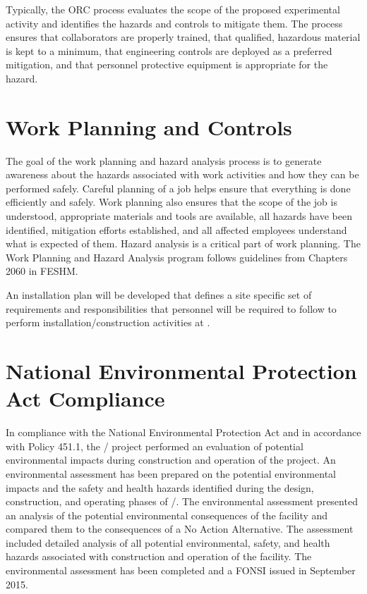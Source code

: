 Typically, the ORC  process evaluates the scope of the proposed
experimental activity and identifies the hazards and controls to
mitigate them. The process ensures that collaborators are properly trained, that
qualified, hazardous material is kept to a minimum, that engineering
controls are deployed as a preferred mitigation, and that personnel
protective equipment is appropriate for the hazard.

\section{Work Planning and Controls}

The goal of the work planning and hazard analysis process is to
generate awareness about the hazards associated with work activities
and how they can be performed safely. Careful planning of a job helps
ensure that everything is done efficiently and safely. Work planning also
ensures that the scope of the job is understood, appropriate materials
and tools are available, all hazards have been identified, mitigation
efforts established, and all affected employees understand what is
expected of them. Hazard analysis is a critical part of work planning.
The Work Planning and Hazard Analysis program follows guidelines from
Chapters 2060 in FESHM.

An installation  plan will be developed
that defines a site specific set of  requirements and
responsibilities that personnel will be required to follow to perform
installation/construction activities at \surf.

\section{National Environmental Protection Act Compliance}

In compliance with the National Environmental Protection Act 
and in accordance with  Policy 451.1, the
/ project performed an evaluation of potential
environmental impacts during construction and operation of the
project.  An environmental assessment has been prepared on the potential environmental impacts and the safety and health
hazards identified during the design, construction, and operating
phases of /.  The environmental assessment presented an analysis of the potential
environmental consequences of the facility and compared them to the
consequences of a No Action Alternative. The assessment included
detailed analysis of all potential environmental, safety, and health
hazards associated with construction and operation of the facility.
The environmental assessment has been completed and a FONSI
issued in September 2015.

